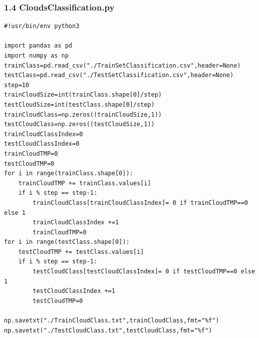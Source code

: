 \documentclass[12pt]{ctexart}
\begin{document}
\subsubsection*{1.4 CloudsClassification.py}
\begin{scriptsize}
\begin{verbatim}
#!usr/bin/env python3

import pandas as pd
import numpy as np
trainClass=pd.read_csv("./TrainSetClassification.csv",header=None)
testClass=pd.read_csv("./TestSetClassification.csv",header=None)
step=10
trainCloudSize=int(trainClass.shape[0]/step)
testCloudSize=int(testClass.shape[0]/step)
trainCloudClass=np.zeros((trainCloudSize,1))
testCloudClass=np.zeros((testCloudSize,1))
trainCloudClassIndex=0
testCloudClassIndex=0
trainCloudTMP=0
testCloudTMP=0
for i in range(trainClass.shape[0]):
    trainCloudTMP += trainClass.values[i]
    if i % step == step-1:
        trainCloudClass[trainCloudClassIndex]= 0 if trainCloudTMP==0 else 1
        trainCloudClassIndex +=1
        trainCloudTMP=0
for i in range(testClass.shape[0]):
    testCloudTMP += testClass.values[i]
    if i % step == step-1:
        testCloudClass[testCloudClassIndex]= 0 if testCloudTMP==0 else 1
        testCloudClassIndex +=1
        testCloudTMP=0

np.savetxt("./TrainCloudClass.txt",trainCloudClass,fmt="%f")
np.savetxt("./TestCloudClass.txt",testCloudClass,fmt="%f")

\end{verbatim}
\end{scriptsize}
\end{document}
